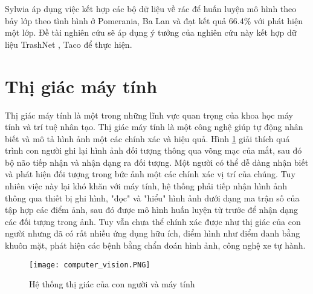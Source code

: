 \documentclass[../the.tex]{subfiles}
\begin{document}
\bigskip

{\fontsize{13}{12} \selectfont

	Sylwia \etal  \cite{Majchrowska_2022} áp dụng việc kết hợp các bộ dữ liệu về rác để huấn luyện mô hình theo bảy lớp theo tình hình ở Pomerania, Ba Lan và đạt kết quả 66.4\% với phát hiện một lớp.
	Đề tài nghiên cứu sẽ áp dụng ý tưởng của nghiên cứu này \cite{Majchrowska_2022} kết hợp dữ liệu TrashNet \cite{yang2016classification}, Taco \cite{proença2020taco} để thực hiện.

}

\section{Thị giác máy tính}
\label{sec:ttmt}

{\fontsize{13}{12}\selectfont

	Thị giác máy tính là một trong những lĩnh vực quan trọng của khoa học máy tính và trí tuệ nhân tạo. Thị giác máy tính là một công nghệ giúp tự động nhân biết và mô tả hình ảnh một các chính xác và hiệu quả. Hình \ref{fig:computer_vision} giải thích quá trình con người ghi lại hình ảnh đối tượng thông qua võng mạc của mắt, sau đó bộ não tiếp nhận và nhận dạng ra đối tượng. Một người có thể dễ dàng nhận biết và phát hiện đối tượng trong bức ảnh một các chính xác vị trí của chúng. Tuy nhiên việc này lại khó khăn với máy tính, hệ thống phải tiếp nhận hình ảnh thông qua thiết bị ghi hình, "đọc" và "hiểu" hình ảnh dưới dạng ma trận số của tập hợp các điểm ảnh, sau đó được mô hình huấn luyện từ trước để nhận dạng các đối tượng trong ảnh. Tuy vẫn chưa thể chính xác được như thị giác của con người nhưng đã có rất nhiều ứng dụng hữu ích, điểm hình như điểm danh bằng khuôn mặt, phát hiện các bệnh bằng chẩn đoán hình ảnh, công nghệ xe tự hành.

}

\begin{figure}[H]
	\centering
	\texttt{[image: computer\_vision.PNG]}
	\caption{Hệ thống thị giác của con người và máy tính}
	\label{fig:computer_vision}
\end{figure}
\end{document}
